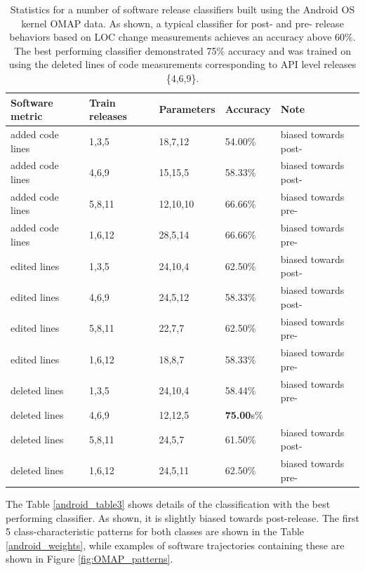 \begin{table}
\begin{tabularx}{\linewidth}{l X X X l}
\toprule
Software metric & Train releases  & Parameters      & Accuracy        & Note\\
\midrule
added code lines &       1,3,5 &  18,7,12& 54.00\% & biased towards post-\\
added code lines &        4,6,9 &  15,15,5 &58.33\% & biased towards post-\\
added code lines &      5,8,11 & 12,10,10 &       66.66\% & biased towards pre-\\
added code lines &       1,6,12 & 28,5,14& 66.66\% & biased towards pre-\\
edited lines &   1,3,5  & 24,10,4& 62.50\%& biased towards post-\\
edited lines &   4,6,9  & 24,5,12& 58.33\% & biased towards post-\\
edited lines &   5,8,11&  22,7,7 & 62.50\%  &biased towards pre-\\
edited lines &   1,6,12 & 18,8,7 & 58.33\% & biased towards pre-\\
deleted lines &  1,3,5  & 24,10,4& 58.44\% & biased towards pre-\\
deleted lines &  4,6,9  & 12,12,5 &\textbf{75.00}s\%  & \\
deleted lines &  5,8,11&  24,5,7 & 61.50\% & biased towards post-\\
deleted lines &  1,6,12 & 24,5,11 &62.50\% & biased towards pre-\\
\bottomrule
\end{tabularx}
\caption{Statistics for a number of software release classifiers built using the Android OS kernel OMAP data. As shown, a typical classifier for post- and pre- release behaviors based on LOC change measurements achieves an accuracy above 60\%. The best performing classifier demonstrated 75\% accuracy and was trained on using the deleted lines of code measurements corresponding to API level releases \{4,6,9\}.}
\label{android_accuracy}
\end{table}

The Table \ref{android_table3} shows details of the classification with the best performing classifier. As shown, it is slightly biased towards post-release. The first 5 class-characteristic patterns for both classes are shown in the Table \ref{android_weights}, while examples of software trajectories containing these are shown in Figure \ref{fig:OMAP_patterns}.

